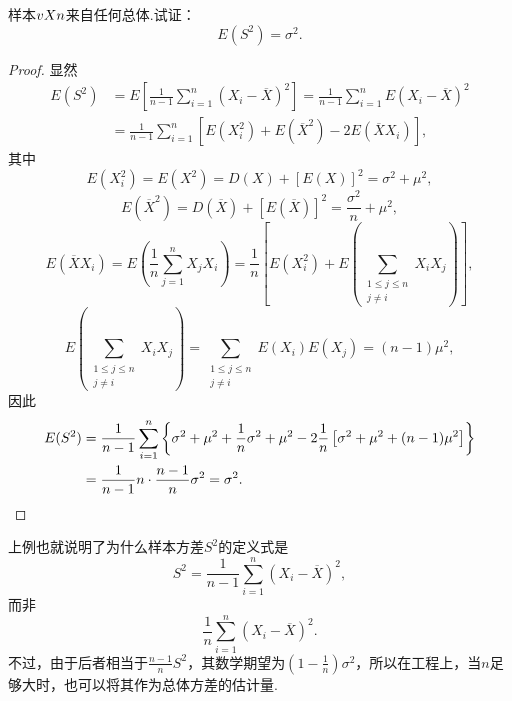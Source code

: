 \begin{example}
样本\(v{X}{n}\)来自任何总体.试证：\begin{equation}
E(S^2) = \sigma^2.
\end{equation}
\begin{proof}
显然\begin{align*}
E(S^2)
&= E\left[\frac{1}{n-1} \sum\limits_{i=1}^n (X_i-\overline{X})^2\right]
= \frac{1}{n-1} \sum\limits_{i=1}^n E(X_i-\overline{X})^2 \\
&= \frac{1}{n-1} \sum\limits_{i=1}^n \left[ E(X_i^2) + E(\overline{X}^2) - 2 E(\overline{X} X_i) \right],
\end{align*}
其中\[
E(X_i^2) = E(X^2) = D(X) + [E(X)]^2 = \sigma^2 + \mu^2,
\]\[
E(\overline{X}^2)
= D(\overline{X}) + [E(\overline{X})]^2
= \frac{\sigma^2}{n} + \mu^2,
\]\[
E(\overline{X} X_i)
= E\left(\frac{1}{n} \sum\limits_{j=1}^n X_j X_i\right)
= \frac{1}{n} \left[ E(X_i^2) + E\left(\sum\limits_{\substack{1 \leqslant j \leqslant n \\ j \neq i}} X_i X_j\right) \right],
\]\[
E\left(\sum\limits_{\substack{1 \leqslant j \leqslant n \\ j \neq i}} X_i X_j\right)
= \sum\limits_{\substack{1 \leqslant j \leqslant n \\ j \neq i}} E(X_i) E(X_j)
= (n-1) \mu^2,
\]因此\begin{align*}
E(S^2) &= \frac{1}{n-1} \sum\limits_{i=1}^n \left\{
\sigma^2 + \mu^2
+ \frac{1}{n} \sigma^2 + \mu^2
- 2 \frac{1}{n} \left[ \sigma^2 + \mu^2 + (n-1)\mu^2 \right]
\right\} \\
&= \frac{1}{n-1} n \cdot \frac{n-1}{n} \sigma^2
= \sigma^2.
\qedhere
\end{align*}
\end{proof}
\end{example}
上例也就说明了为什么样本方差\(S^2\)的定义式是\[
S^2 = \frac{1}{n-1} \sum\limits_{i=1}^n (X_i-\overline{X})^2,
\]而非\[
\frac{1}{n} \sum\limits_{i=1}^n (X_i-\overline{X})^2.
\]
不过，由于后者相当于\(\frac{n-1}{n} S^2\)，其数学期望为\(\left(1-\frac{1}{n}\right) \sigma^2\)，所以在工程上，当\(n\)足够大时，也可以将其作为总体方差的估计量.

